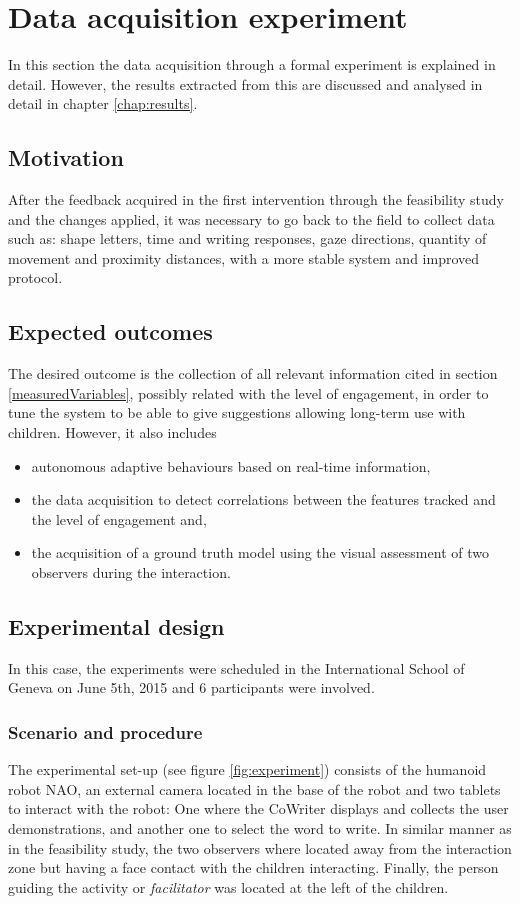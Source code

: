 \section{Data acquisition experiment} \label{sec:experiment} 
In this section the data acquisition through a formal experiment is explained in detail. However, the results extracted from this are discussed and analysed in detail in chapter \ref{chap:results}.
\subsection{Motivation}
After the feedback acquired in the first intervention through the feasibility study and the changes applied, it was necessary to go back to the field to collect data such as: shape letters, time and writing responses, gaze directions, quantity of movement and proximity distances, with a more stable system and improved protocol.


\subsection{Expected outcomes}

The desired outcome is the collection of all relevant information cited in section \ref{measuredVariables}, possibly related with the level of engagement, in order to tune the system to be able to give suggestions allowing long-term use with children. However, it also includes

\begin{itemize}
\item autonomous adaptive behaviours based on real-time information,
\item the data acquisition to detect correlations between the features tracked and the level of engagement and,
\item the acquisition of a ground truth model using the visual assessment of two observers during the interaction.

\end{itemize}

\subsection{Experimental design}
In this case, the experiments were scheduled in the International School of Geneva on June 5th, 2015 and 6 participants were involved.

\subsubsection{Scenario and procedure}
The experimental set-up (see figure \ref{fig:experiment}) consists of the humanoid robot NAO, an external camera located in the base of the robot and two tablets to interact with the robot: One where the CoWriter displays and collects the user demonstrations, and another one to select the word to write. In similar manner as in the feasibility study, the two observers where located away from the interaction zone but having a face contact with the children interacting. Finally, the person guiding the activity or \textit{facilitator} was located at the left of the children. 

